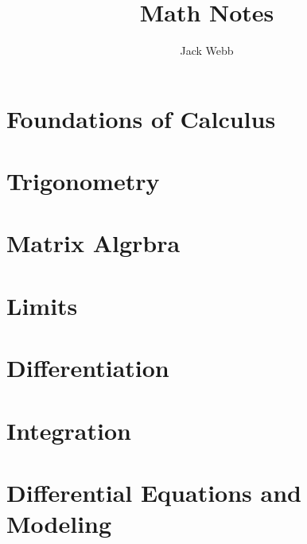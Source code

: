 \documentclass{article}
\title{Math Notes}
\author{Jack Webb}
\begin{document}
\maketitle
\pagebreak
{}
\tableofcontents
\clearpage
{}

\section{Foundations of Calculus}

\clearpage

\section{Trigonometry}

\clearpage

\section{Matrix Algrbra}

\clearpage

\section{Limits}

\clearpage

\section{Differentiation}

\clearpage

\section{Integration}

\clearpage

\section{Differential Equations and Modeling}

\clearpage
\end{document}
